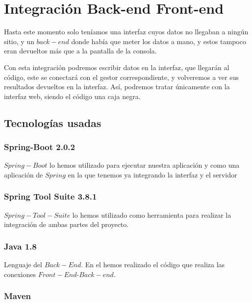\documentclass[12pt,a4paper]{article}
\begin{document}

\newpage
\mbox{}
\newpage

\section{Integración Back-end Front-end} \label{pto8}

Hasta este momento solo teníamos una interfaz cuyos datos no llegaban a ningún sitio, y un $back-end$ donde había que meter los datos a mano, y estos tampoco eran devueltos más que a la pantalla de la consola.

Con esta integración podremos escribir datos en la interfaz, que llegarán al código, este se conectará con el gestor correspondiente, y volveremos a ver sus resultados devueltos en la interfaz. Así, podremos tratar únicamente con la interfaz web, siendo el código una caja negra.

\subsection{Tecnologías usadas} \label{pto81}
	\subsubsection{Spring-Boot 2.0.2} \label{pto811}
	
	$Spring-Boot$ lo hemos utilizado para ejecutar nuestra aplicación y como una aplicación de $Spring$ en la que tenemos ya integrando la interfaz y el servidor
	\subsubsection{Spring Tool Suite 3.8.1} \label{pto812}
	
	$Spring-Tool-Suite$ lo hemos utilizado como herramienta para realizar la integración de ambas partes del proyecto.
	\subsubsection{Java 1.8} \label{pto813}
	
	Lenguaje del $Back-End$. En el hemos realizado el código que realiza las conexiones $Front-End$-$Back-end$.
	
	\subsubsection{Maven} \label{pto814} 
	
\end{document}

